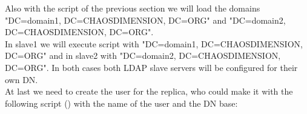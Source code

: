 Also with the script of the previous section we will load the domains\\ "DC=domain1, DC=CHAOSDIMENSION, DC=ORG" and "DC=domain2, DC=CHAOSDIMENSION, DC=ORG". \\

In slave1 we will execute script with "DC=domain1, DC=CHAOSDIMENSION, DC=ORG" and in slave2 with "DC=domain2, DC=CHAOSDIMENSION, DC=ORG". In both cases both LDAP slave servers will be configured for their own DN.\\

At last we need to create the user for the replica, who could make it with the following script () with the name of the user and the DN base: \\

